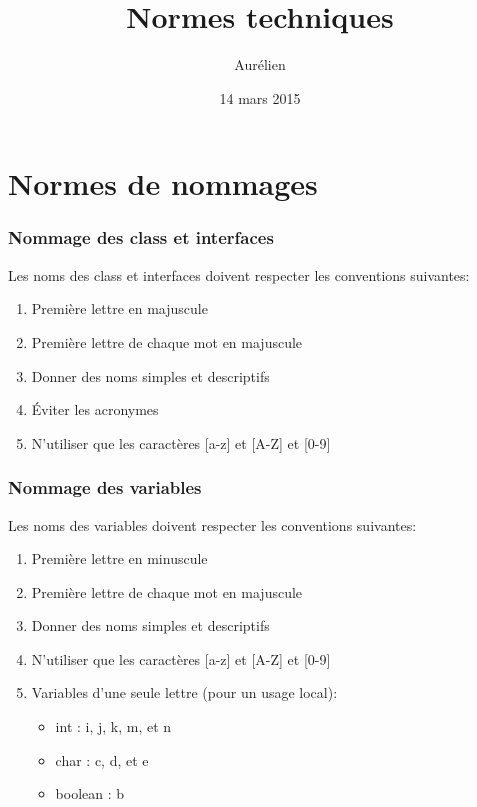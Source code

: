\documentclass{article}
\title{Normes techniques}
\author{Aurélien \bsc{Svevi}}
\date{14 mars 2015}
\begin{document}
\maketitle

\tableofcontents
\newpage

\part*{Normes de nommages}
\section{Nommage des class et interfaces}

Les noms des class et interfaces doivent respecter les conventions suivantes:

\begin{enumerate}

\item Première lettre en majuscule
\item Première lettre de chaque mot en majuscule
\item Donner des noms simples et descriptifs
\item Éviter les acronymes
\item N'utiliser que les caractères [a-z] et [A-Z] et [0-9]

\end{enumerate}

\section{Nommage des variables}

Les noms des variables doivent respecter les conventions suivantes:

\begin{enumerate}

\item Première lettre en minuscule
\item Première lettre de chaque mot en majuscule
\item Donner des noms simples et descriptifs
\item N'utiliser que les caractères [a-z] et [A-Z] et [0-9]
\item Variables d'une seule lettre (pour un usage local):\begin{itemize}
	\item int : i, j, k, m, et n 
	\item char : c, d, et e 
	\item boolean : b
	\end{itemize}

\end{enumerate}
\end{document}
